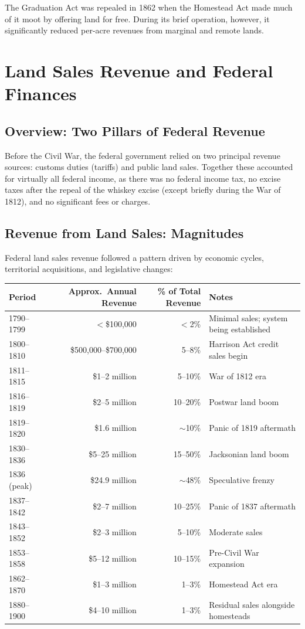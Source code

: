 \documentclass[12pt]{article}
\begin{document}
The Graduation Act was repealed in 1862 when the Homestead Act made much of it moot by offering land for free.  During its brief operation, however, it significantly reduced per-acre revenues from marginal and remote lands.


\section{Land Sales Revenue and Federal Finances}\label{sec:revenue}

\subsection{Overview: Two Pillars of Federal Revenue}

Before the Civil War, the federal government relied on two principal revenue sources: customs duties (tariffs) and public land sales.  Together these accounted for virtually all federal income, as there was no federal income tax, no excise taxes after the repeal of the whiskey excise (except briefly during the War of 1812), and no significant fees or charges.

\subsection{Revenue from Land Sales: Magnitudes}

Federal land sales revenue followed a pattern driven by economic cycles, territorial acquisitions, and legislative changes:

\begin{center}
\begin{tabular}{lrrl}
\toprule
Period & Approx.\ Annual Revenue & \% of Total Revenue & Notes \\
\midrule
1790--1799 & $<$\$100,000 & $<$2\% & Minimal sales; system being established \\
1800--1810 & \$500,000--\$700,000 & 5--8\% & Harrison Act credit sales begin \\
1811--1815 & \$1--2 million & 5--10\% & War of 1812 era \\
1816--1819 & \$2--5 million & 10--20\% & Postwar land boom \\
1819--1820 & \$1.6 million & $\sim$10\% & Panic of 1819 aftermath \\
1830--1836 & \$5--25 million & 15--50\% & Jacksonian land boom \\
1836 (peak) & \$24.9 million & $\sim$48\% & Speculative frenzy \\
1837--1842 & \$2--7 million & 10--25\% & Panic of 1837 aftermath \\
1843--1852 & \$2--3 million & 5--10\% & Moderate sales \\
1853--1858 & \$5--12 million & 10--15\% & Pre-Civil War expansion \\
1862--1870 & \$1--3 million & 1--3\% & Homestead Act era \\
1880--1900 & \$4--10 million & 1--3\% & Residual sales alongside homesteads \\
\bottomrule
\end{tabular}
\end{center}
\end{document}
